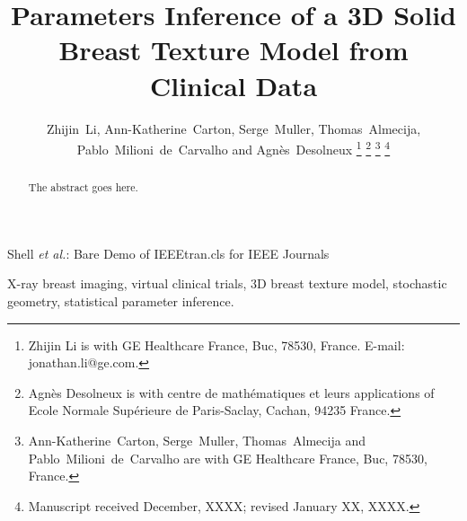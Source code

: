 \documentclass[journal]{IEEEtran}
\begin{document}
\title{Parameters Inference of a 3D Solid Breast Texture Model from
  Clinical Data}

\author{Zhijin~Li, Ann-Katherine~Carton, Serge~Muller,
  Thomas~Almecija, Pablo~Milioni~de~Carvalho and
  Agnès~Desolneux%
  \thanks{Zhijin Li is with GE Healthcare France, Buc, 78530,
    France. E-mail: jonathan.li@ge.com.}%
  \thanks{Agnès Desolneux is with centre de math\'{e}matiques et leurs
    applications of Ecole Normale Sup\'{e}rieure de Paris-Saclay,
    Cachan, 94235 France.}%
  \thanks{Ann-Katherine~Carton, Serge~Muller, Thomas~Almecija and
    Pablo~Milioni~de~Carvalho are with GE Healthcare France, Buc,
    78530, France.}%
  \thanks{Manuscript received December, XXXX; revised January XX,
    XXXX.}}%
%
%
{Shell \MakeLowercase{\textit{et al.}}: Bare Demo of IEEEtran.cls for
  IEEE Journals}
%



\maketitle

\begin{abstract}
  The abstract goes here.
\end{abstract}

\begin{IEEEkeywords}
  X-ray breast imaging, virtual clinical trials, 3D breast texture
  model, stochastic geometry, statistical parameter inference.
\end{IEEEkeywords}
\end{document}

